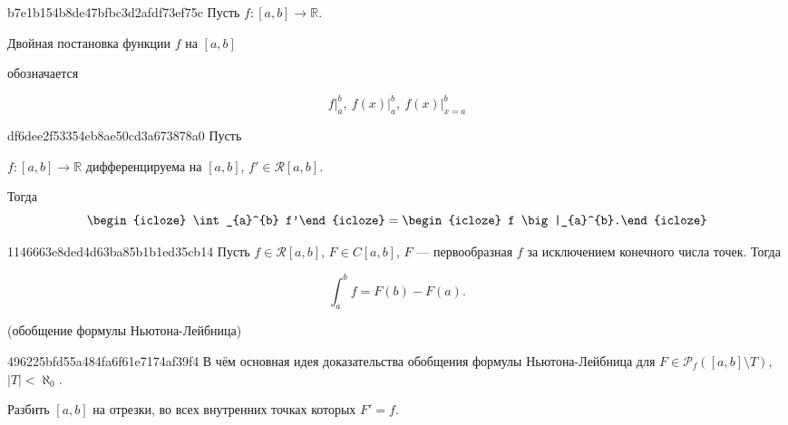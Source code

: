\begin{note}{b7e1b154b8de47bfbc3d2afdf73ef75c}
    Пусть \({ f : [a, b] \to \mathbb R }\).
    \begin{icloze}{1}Двойная постановка функции \({ f }\) на \({ [a, b] }\)\end{icloze} обозначается
    \begin{icloze}{2}
        \[
            f \big|_{a}^{b},\: f(x) \big|_{a}^{b},\: f(x) \big|_{x = a}^{b}
        \]
    \end{icloze}
\end{note}

\begin{note}{df6dee2f53354eb8ae50cd3a673878a0}
    Пусть \begin{icloze}{3}\({ f : [a, b] \to \mathbb R }\) дифференцируема на \({ [a, b] }\), \({ f' \in \mathcal R[a, b] }\).\end{icloze} Тогда
    \[
        \begin{icloze}{2}\int_{a}^{b} f'\end{icloze} = \begin{icloze}{1}f \big|_{a}^{b}.\end{icloze}
    \]
\end{note}

\begin{note}{1146663e8ded4d63ba85b1b1ed35cb14}
    Пусть \({ f \in \mathcal R[a, b] }\), \({ F \in C[a, b] }\), \({ F }\) --- первообразная \({ f }\) за исключением конечного числа точек.
    Тогда
    \begin{icloze}{1}
        \[
            \int_{a}^{b} f = F(b) - F(a).
        \]
    \end{icloze}

    \begin{center}
        \tiny
        (обобщение формулы Ньютона-Лейбница)
    \end{center}
\end{note}

\begin{note}{496225bfd55a484fa6f61e7174af39f4}
    В чём основная идея доказательства обобщения формулы Ньютона-Лейбница для \({ F \in \mathscr P_f ([a, b] \setminus T) }\),\: \({ |T| < \aleph_0 }\).

    \begin{cloze}{1}
        Разбить \({ [a, b] }\) на отрезки, во всех внутренних точках которых \({ F' = f }\).
    \end{cloze}
\end{note}

